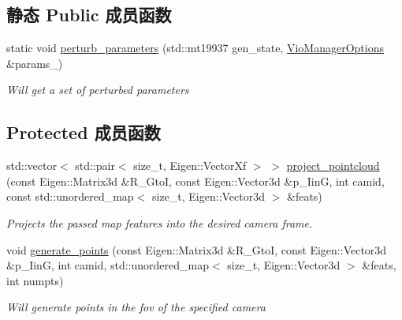 \subsection*{静态 Public 成员函数}
\begin{DoxyCompactItemize}
\item 
static void \hyperlink{classov__msckf_1_1Simulator_ab7b38fccf364b602eef8294524f3f30a}{perturb\+\_\+parameters} (std\+::mt19937 gen\+\_\+state, \hyperlink{structov__msckf_1_1VioManagerOptions}{Vio\+Manager\+Options} \&params\+\_\+)
\begin{DoxyCompactList}\small\item\em Will get a set of perturbed parameters \end{DoxyCompactList}\end{DoxyCompactItemize}
\subsection*{Protected 成员函数}
\begin{DoxyCompactItemize}
\item 
std\+::vector$<$ std\+::pair$<$ size\+\_\+t, Eigen\+::\+Vector\+Xf $>$ $>$ \hyperlink{classov__msckf_1_1Simulator_a1c6947099892bd64e2bad9b4c9303226}{project\+\_\+pointcloud} (const Eigen\+::\+Matrix3d \&R\+\_\+\+GtoI, const Eigen\+::\+Vector3d \&p\+\_\+\+IinG, int camid, const std\+::unordered\+\_\+map$<$ size\+\_\+t, Eigen\+::\+Vector3d $>$ \&feats)
\begin{DoxyCompactList}\small\item\em Projects the passed map features into the desired camera frame. \end{DoxyCompactList}\item 
void \hyperlink{classov__msckf_1_1Simulator_a511b2edf20545972ced008fddb0654ae}{generate\+\_\+points} (const Eigen\+::\+Matrix3d \&R\+\_\+\+GtoI, const Eigen\+::\+Vector3d \&p\+\_\+\+IinG, int camid, std\+::unordered\+\_\+map$<$ size\+\_\+t, Eigen\+::\+Vector3d $>$ \&feats, int numpts)
\begin{DoxyCompactList}\small\item\em Will generate points in the fov of the specified camera \end{DoxyCompactList}\end{DoxyCompactItemize}
